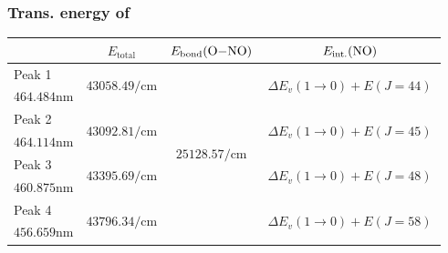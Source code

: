 \documentclass[aspectratio=43,handout]{ctexbeamer}
\begin{document}
		\subsubsection{Trans. energy of }
	\begin{frame}{\insertsubsection}{\insertsubsubsection}
		\begin{table}[htbp]
			\centering
			\tiny
			\begin{tabularx}{0.9\textwidth}{lccc}
				\toprule
				& $E_\text{total}$ & $E_\text{bond}(\ce{O-NO})$ \footfullcite{ono}& $E_\text{int.}(\ce{NO})$ \\
				\midrule
				Peak 1 & \multirow{2}[2]{*}{$\num{43058.49}\unit{\per \centi \meter}$} & \multirow{8}[8]{*}{$\num{25128.57}\unit{\per \centi \meter}$} & \multirow{2}[2]{*}{\quad\quad\,$\Delta E_v (1\rightarrow 0)+ E( J = 44 )$\quad\quad\,} \\
				$\num{464.484}\unit{\nano\meter}$ & & & \\
				\cmidrule{1-2}\cmidrule{4-4}
				Peak 2 & \multirow{2}[2]{*}{$\num{43092.81}\unit{\per \centi \meter}$} & & \multirow{2}[2]{*}{\quad\quad\,$\Delta E_v (1\rightarrow 0)+ E( J = 45 )$\quad\quad\,} \\
				$\num{464.114}\unit{\nano\meter}$ & & & \\
				\cmidrule{1-2}\cmidrule{4-4}
				Peak 3 & \multirow{2}[2]{*}{$\num{43395.69}\unit{\per \centi \meter}$} & & \multirow{2}[2]{*}{\quad\quad\,$\Delta E_v (1\rightarrow 0)+ E( J = 48 )$\quad\quad\,} \\
				$\num{460.875}\unit{\nano\meter}$ & & & \\
				\cmidrule{1-2}\cmidrule{4-4}
				Peak 4 & \multirow{2}[2]{*}{$\num{43796.34}\unit{\per \centi \meter}$} & & \multirow{2}[2]{*}{\quad\quad\,$\Delta E_v (1\rightarrow 0)+ E( J = 58 )$\quad\quad\,} \\
				$\num{456.659}\unit{\nano\meter}$ & & & \\
				\bottomrule
			\end{tabularx}
		\end{table}
	\end{frame}
\end{document}
